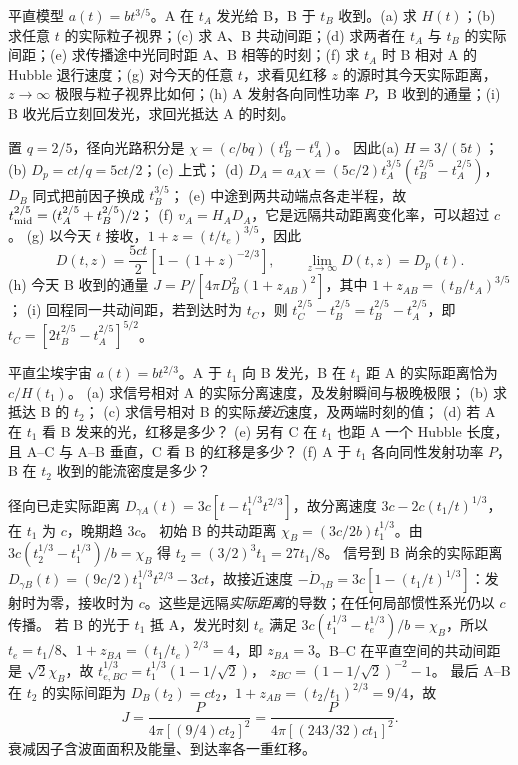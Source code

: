 \begin{exercise}
平直模型 $a(t)=bt^{3/5}$。A 在 $t_A$ 发光给 B，B 于 $t_B$ 收到。(a) 求 $H(t)$；(b) 求任意 $t$ 的实际粒子视界；(c) 求 A、B 共动间距；(d) 求两者在 $t_A$ 与 $t_B$ 的实际间距；(e) 求传播途中光同时距 A、B 相等的时刻；(f) 求 $t_A$ 时 B 相对 A 的 Hubble 退行速度；(g) 对今天的任意 $t$，求看见红移 $z$ 的源时其今天实际距离，$z\to\infty$ 极限与粒子视界比如何；(h) A 发射各向同性功率 $P$，B 收到的通量；(i) B 收光后立刻回发光，求回光抵达 A 的时刻。
\end{exercise}
\begin{solution}
置 $q=2/5$，径向光路积分是
$\chi=(c/bq)(t_B^q-t_A^q)$。
因此(a) $H=3/(5t)$；(b) $D_p=ct/q=5ct/2$；(c) 上式；
(d) $D_A=a_A\chi=(5c/2)t_A^{3/5}(t_B^{2/5}-t_A^{2/5})$，$D_B$ 同式把前因子换成 $t_B^{3/5}$；
(e) 中途到两共动端点各走半程，故 $t_{\rm mid}^{2/5}=(t_A^{2/5}+t_B^{2/5})/2$；
(f) $v_A=H_A D_A$，它是远隔共动距离变化率，可以超过 $c$。
(g) 以今天 $t$ 接收，$1+z=(t/t_e)^{3/5}$，因此
\[
D(t,z)=\frac{5ct}{2}\left[1-(1+z)^{-2/3}\right],\qquad
\lim_{z\to\infty}D(t,z)=D_p(t).
\]
(h) 今天 B 收到的通量 $J=P/[4\pi D_B^2(1+z_{AB})^2]$，其中 $1+z_{AB}=(t_B/t_A)^{3/5}$；
(i) 回程同一共动间距，若到达时为 $t_C$，则
$t_C^{2/5}-t_B^{2/5}=t_B^{2/5}-t_A^{2/5}$，即 $t_C=[2t_B^{2/5}-t_A^{2/5}]^{5/2}$。
\end{solution}

\begin{exercise}
平直尘埃宇宙 $a(t)=bt^{2/3}$。A 于 $t_1$ 向 B 发光，B 在 $t_1$ 距 A 的实际距离恰为 $c/H(t_1)$。
(a) 求信号相对 A 的实际分离速度，及发射瞬间与极晚极限；
(b) 求抵达 B 的 $t_2$；
(c) 求信号相对 B 的实际\emph{接近}速度，及两端时刻的值；
(d) 若 A 在 $t_1$ 看 B 发来的光，红移是多少？
(e) 另有 C 在 $t_1$ 也距 A 一个 Hubble 长度，且 A--C 与 A--B 垂直，C 看 B 的红移是多少？
(f) A 于 $t_1$ 各向同性发射功率 $P$，B 在 $t_2$ 收到的能流密度是多少？
\end{exercise}
\begin{solution}
径向已走实际距离
$D_{\gamma A}(t)=3c[t-t_1^{1/3}t^{2/3}]$，故分离速度
$3c-2c(t_1/t)^{1/3}$，在 $t_1$ 为 $c$，晚期趋 $3c$。
初始 B 的共动距离 $\chi_B=(3c/2b)t_1^{1/3}$。由
$3c(t_2^{1/3}-t_1^{1/3})/b=\chi_B$ 得
$t_2=(3/2)^3t_1=27t_1/8$。
信号到 B 尚余的实际距离
$D_{\gamma B}(t)=(9c/2)t_1^{1/3}t^{2/3}-3ct$，故接近速度
$-\dot D_{\gamma B}=3c[1-(t_1/t)^{1/3}]$：发射时为零，接收时为 $c$。这些是远隔\emph{实际距离}的导数；在任何局部惯性系光仍以 $c$ 传播。
若 B 的光于 $t_1$ 抵 A，发光时刻 $t_e$ 满足
$3c(t_1^{1/3}-t_e^{1/3})/b=\chi_B$，所以 $t_e=t_1/8$、$1+z_{BA}=(t_1/t_e)^{2/3}=4$，即 $z_{BA}=3$。B--C 在平直空间的共动间距是 $\sqrt2\chi_B$，故
$t_{e,BC}^{1/3}=t_1^{1/3}(1-1/\sqrt2)$，
$z_{BC}=(1-1/\sqrt2)^{-2}-1$。
最后 A--B 在 $t_2$ 的实际间距为 $D_B(t_2)=ct_2$，$1+z_{AB}=(t_2/t_1)^{2/3}=9/4$，故
\[
J=\frac{P}{4\pi[(9/4)ct_2]^2}
=\frac{P}{4\pi[(243/32)ct_1]^2}.
\]
衰减因子含波面面积及能量、到达率各一重红移。
\end{solution}

